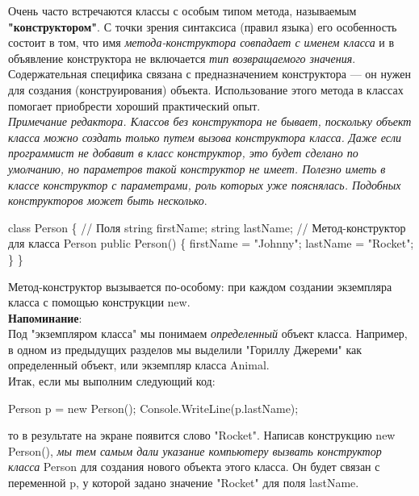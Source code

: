 \documentclass[12pt, a4paper]{article}
\begin{document}
Очень часто встречаются классы с особым типом метода, называемым \textbf{"конструктором"}. С точки зрения синтаксиса (правил языка) его особенность состоит в том, что имя \textit{метода-конструктора совпадает с именем класса}  и в объявление конструктора не включается \textit{тип возвращаемого значения}. Содержательная специфика связана с предназначением конструктора — он нужен для создания (конструирования) объекта. Использование этого метода в классах помогает приобрести хороший практический опыт.\\


\textit{Примечание редактора. Классов без конструктора не бывает, поскольку объект класса можно создать только путем вызова конструктора класса. Даже если программист не добавит в класс конструктор, это будет сделано по умолчанию, но параметров такой конструктор не имеет. Полезно иметь в классе конструктор с параметрами, роль которых уже пояснялась. Подобных конструкторов может быть несколько}.
\begin{spverbatim}class Person
\{
  // Поля
  string firstName;
  string lastName;
  // Метод-конструктор для класса Person
  public Person()
  \{
    firstName = "Johnny";
    lastName = "Rocket";
  \}
\}\end{spverbatim}

Метод-конструктор вызывается по-особому: при каждом создании экземпляра класса с помощью конструкции new.\\

\textbf{Напоминание}:\\

Под "экземпляром класса" мы понимаем \textit{определенный}  объект класса. Например, в одном из предыдущих разделов мы выделили "Гориллу Джереми" как определенный объект, или экземпляр класса Animal.\\

Итак, если мы выполним следующий код:\\

\begin{spverbatim}Person p = new Person();
Console.WriteLine(p.lastName);\end{spverbatim}

то в результате на экране появится слово "Rocket". Написав конструкцию new Person(), \textit{мы тем самым дали указание компьютеру вызвать конструктор класса}  Person  для создания нового объекта этого класса. Он будет связан с переменной p, у которой задано значение "Rocket" для поля lastName.\\
\end{document}
